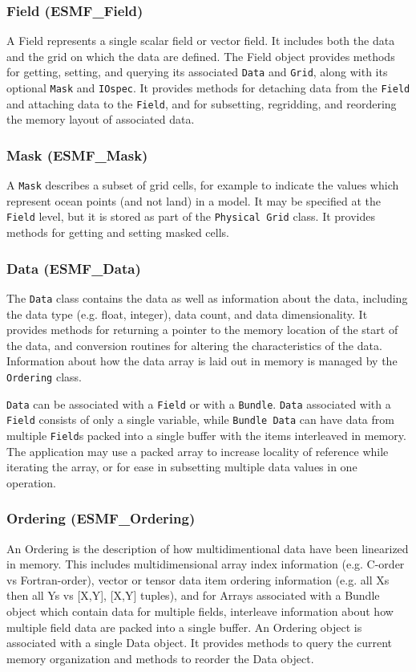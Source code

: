 \subsubsection{Field (ESMF\_Field)}
\label{sec:field} 
A Field represents a single scalar field or vector field.  It includes 
both the data and the grid on which the data are defined.  The Field object provides
methods for getting, setting, and querying its associated {\tt Data} and {\tt Grid},
along with its optional {\tt Mask} and {\tt IOspec}.  It provides methods for detaching 
data from the {\tt Field} and attaching data to the {\tt Field}, and for subsetting, 
regridding, and reordering the memory layout of associated data.

\subsubsection{Mask (ESMF\_Mask)}
\label{sec:mask} 
A {\tt Mask} describes a subset of grid cells, for example to indicate
the values which represent ocean points (and not land) in a model.  
It may be specified at the {\tt Field} level, but it is stored as part 
of the {\tt Physical Grid} class.  It provides methods for getting 
and setting masked cells.

\subsubsection{Data (ESMF\_Data)}
\label{sec:dataarray} 
The {\tt Data} class contains the data as well as information 
about the data, including the data type (e.g. float,
integer), data count, and data dimensionality.  
It provides methods for returning a pointer to the memory 
location of the start of the data, and conversion routines 
for altering the characteristics of the data.  
Information about how the data array is laid
out in memory is managed by the {\tt Ordering} class.

{\tt Data} can be associated with a {\tt Field} or with a {\tt Bundle}.
{\tt Data} associated with a {\tt Field} consists of only a single variable,
while {\tt Bundle Data} can have data from multiple {\tt Field}s packed 
into a single buffer with the items interleaved in memory.  
The application may use a packed array to increase
locality of reference while iterating the array, 
or for ease in subsetting multiple data values in one operation.


\subsubsection{Ordering (ESMF\_Ordering)}
\label{sec:ordering} 
An Ordering is the description of how multidimentional data have been
linearized in memory.  This includes multidimensional array index information (e.g. C-order
vs Fortran-order), vector or tensor data item ordering information (e.g. all Xs then all
Ys vs [X,Y], [X,Y] tuples), and for Arrays associated with a Bundle object which contain
data for multiple fields, interleave information about how multiple field data are 
packed into a single buffer.
An Ordering object is associated with a single Data object.  It provides
methods to query the current memory organization and methods to reorder the Data object.

